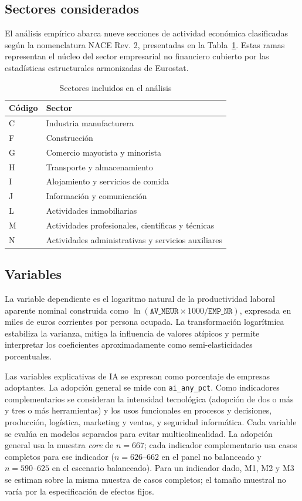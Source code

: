 \documentclass[12pt,a4paper]{article}
\begin{document}
\subsection{Sectores considerados}

El análisis empírico abarca nueve secciones de actividad económica clasificadas según la nomenclatura NACE Rev. 2, presentadas en la Tabla~\ref{tab:sectores}. Estas ramas representan el núcleo del sector empresarial no financiero cubierto por las estadísticas estructurales armonizadas de Eurostat.

\begin{table}[H]
\centering
\caption{Sectores incluidos en el análisis}
\label{tab:sectores}
\begin{tabular}{ll}
\toprule
\textbf{Código} & \textbf{Sector} \\
\midrule
C & Industria manufacturera \\
F & Construcción \\
G & Comercio mayorista y minorista \\
H & Transporte y almacenamiento \\
I & Alojamiento y servicios de comida \\
J & Información y comunicación \\
L & Actividades inmobiliarias \\
M & Actividades profesionales, científicas y técnicas \\
N & Actividades administrativas y servicios auxiliares \\
\bottomrule
\end{tabular}
\end{table}

\subsection{Variables}

La variable dependiente es el logaritmo natural de la productividad laboral aparente nominal construida como $\ln(\texttt{AV\_MEUR}\times1000/\texttt{EMP\_NR})$, expresada en miles de euros corrientes por persona ocupada. La transformación logarítmica estabiliza la varianza, mitiga la influencia de valores atípicos y permite interpretar los coeficientes aproximadamente como semi-elasticidades porcentuales.

Las variables explicativas de IA se expresan como porcentaje de empresas adoptantes. La adopción general se mide con \texttt{ai\_any\_pct}. Como indicadores complementarios se consideran la intensidad tecnológica (adopción de dos o más y tres o más herramientas) y los usos funcionales en procesos y decisiones, producción, logística, marketing y ventas, y seguridad informática. Cada variable se evalúa en modelos separados para evitar multicolinealidad. La adopción general usa la muestra \textit{core} de $n=667$; cada indicador complementario usa casos completos para ese indicador ($n=626\text{--}662$ en el panel no balanceado y $n=590\text{--}625$ en el escenario balanceado). Para un indicador dado, M1, M2 y M3 se estiman sobre la misma muestra de casos completos; el tamaño muestral no varía por la especificación de efectos fijos.
\end{document}
